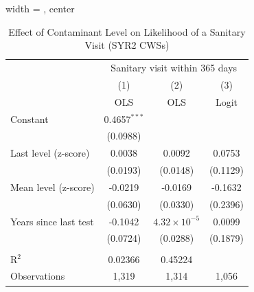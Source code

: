 
\begin{table}[htbp]
   
   \caption{\label{tab:monitoring_retesting_sanitary_visit} Effect of Contaminant Level on Likelihood of a Sanitary Visit (SYR2 CWSs)}
   \bigskip
   
   \centering
   
   \begin{adjustbox}{width = \textwidth, center}
      
      
      \begin{tabular}{lccc}
         \toprule
         
          & \multicolumn{3}{c}{Sanitary visit within 365 days}\\
         
                               & (1)            & (2)                   & (3)\\  
         
                               &  OLS           & OLS                   & Logit\\  
         
         \midrule 
         Constant              & 0.4657$^{***}$ &                       &   \\   
                               & (0.0988)       &                       &   \\   
         Last level (z-score)  & 0.0038         & 0.0092                & 0.0753\\   
                               & (0.0193)       & (0.0148)              & (0.1129)\\   
         Mean level (z-score)  & -0.0219        & -0.0169               & -0.1632\\   
                               & (0.0630)       & (0.0330)              & (0.2396)\\   
         Years since last test & -0.1042        & $4.32\times 10^{-5}$  & 0.0099\\   
                               & (0.0724)       & (0.0288)              & (0.1879)\\   
         
          \\
         
         R$^2$                 & 0.02366        & 0.45224               & \\  
         Observations          & 1,319          & 1,314                 & 1,056\\  
         

\end{tabular}
\end{adjustbox}
\end{table}
